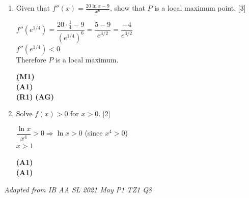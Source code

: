 \documentclass[12pt, twoside]{article}
\begin{document}
\begin{enumerate}[itemsep=0.2cm]
\begin{enumerate}[itemsep=0.3cm]
  \begin{minipage}[t]{0.62\textwidth}
  $f'(x) = 0 \Rightarrow 1 - 4\ln x = 0$\\[0.15cm]
  $\ln x = \dfrac{1}{4}$\\[0.15cm]
  $x = e^{1/4}$\\[0.15cm]
  $y = \dfrac{\ln e^{1/4}}{(e^{1/4})^4} = \dfrac{\frac{1}{4}}{e} = \dfrac{1}{4e}$\\[0.2cm]
  $P\!\left(e^{1/4},\; \dfrac{1}{4e}\right)$
  \end{minipage}%
  \begin{minipage}[t]{0.35\textwidth}\raggedleft
  \textbf{(M1)}\\[0.15cm]
  \textbf{(A1)}\\[0.15cm]
  \textbf{(A1)}\\[0.15cm]
  \textbf{(M1)}\\[0.2cm]
  \textbf{(A1)}
  \end{minipage}

  \bigskip
  \item Given that $\displaystyle f''(x) = \frac{20\ln x - 9}{x^6}$,
        show that $P$ is a local maximum point. \hfill [3]

  \begin{minipage}[t]{0.62\textwidth}
  $f''\!\left(e^{1/4}\right) = \dfrac{20 \cdot \frac{1}{4} - 9}{(e^{1/4})^6}
    = \dfrac{5 - 9}{e^{3/2}} = \dfrac{-4}{e^{3/2}}$\\[0.3cm]
  $f''\!\left(e^{1/4}\right) < 0$\\[0.15cm]
  Therefore $P$ is a local maximum.
  \end{minipage}%
  \begin{minipage}[t]{0.35\textwidth}\raggedleft
  \textbf{(M1)}\\[0.3cm]
  \textbf{(A1)}\\[0.15cm]
  \textbf{(R1)} \textbf{(AG)}
  \end{minipage}

  \bigskip
  \item Solve $f(x) > 0$ for $x > 0$. \hfill [2]

  \begin{minipage}[t]{0.62\textwidth}
  $\dfrac{\ln x}{x^4} > 0 \Rightarrow \ln x > 0$ \quad (since $x^4 > 0$)\\[0.2cm]
  $x > 1$
  \end{minipage}%
  \begin{minipage}[t]{0.35\textwidth}\raggedleft
  \textbf{(A1)}\\[0.2cm]
  \textbf{(A1)}
  \end{minipage}
\end{enumerate}

\hfill \emph{Adapted from IB AA SL 2021 May P1 TZ1 Q8}

\end{enumerate}
\end{document}
